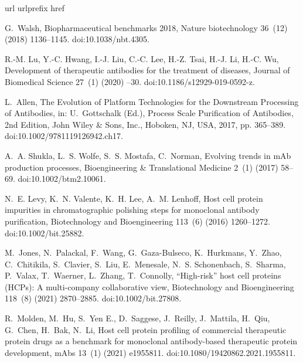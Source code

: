\documentclass[preprint,review,12pt]{elsarticle}
\providecommand{\DIFaddtex}[1]{{\protect\color{blue} \sf #1}} %
\providecommand{\DIFaddbegin}{} %
\providecommand{\DIFaddend}{} %
\providecommand{\DIFadd}[1]{\texorpdfstring{\DIFaddtex{#1}}{#1}} %
\begin{document}

\begin{thebibliography}{10}
\expandafter\ifx\csname url\endcsname\relax
  \def\url#1{\texttt{#1}}\fi
\expandafter\ifx\csname urlprefix\endcsname\relax\def\urlprefix{URL }\fi
\expandafter\ifx\csname href\endcsname\relax
  \def\href#1#2{#2} \def\path#1{#1}\fi

G.~Walsh, {Biopharmaceutical benchmarks 2018}, Nature biotechnology 36~(12)
  (2018) 1136--1145.
\newblock \href {https://doi.org/10.1038/nbt.4305}
  {\path{doi:10.1038/nbt.4305}}.

R.-M. Lu, Y.-C. Hwang, I.-J. Liu, C.-C. Lee, H.-Z. Tsai, H.-J. Li, H.-C. Wu,
  {Development of therapeutic antibodies for the treatment of diseases},
  Journal of Biomedical Science 27~(1) (2020) \DIFaddbegin \DIFadd{1--30}\DIFaddend .
\newblock \href {https://doi.org/10.1186/s12929-019-0592-z}
  {\path{doi:10.1186/s12929-019-0592-z}}.

L.~Allen, {The Evolution of Platform Technologies for the Downstream Processing
  of Antibodies}, in: U.~Gottschalk (Ed.), Process Scale Purification of
  Antibodies, 2nd Edition, John Wiley \& Sons, Inc., Hoboken, NJ, USA, 2017,
  pp. 365--389.
\newblock \href {https://doi.org/10.1002/9781119126942.ch17}
  {\path{doi:10.1002/9781119126942.ch17}}.

A.~A. Shukla, L.~S. Wolfe, S.~S. Mostafa, C.~Norman, {Evolving trends in mAb
  production processes}, Bioengineering \& Translational Medicine 2~(1) (2017)
  58--69.
\newblock \href {https://doi.org/10.1002/btm2.10061}
  {\path{doi:10.1002/btm2.10061}}.

N.~E. Levy, K.~N. Valente, K.~H. Lee, A.~M. Lenhoff, {Host cell protein
  impurities in chromatographic polishing steps for monoclonal antibody
  purification}, Biotechnology and Bioengineering 113~(6) (2016) 1260--1272.
\newblock \href {https://doi.org/10.1002/bit.25882}
  {\path{doi:10.1002/bit.25882}}.

M.~Jones, N.~Palackal, F.~Wang, G.~Gaza-Bulseco, K.~Hurkmans, Y.~Zhao,
  C.~Chitikila, S.~Clavier, S.~Liu, E.~Menesale, N.~S. Schonenbach, S.~Sharma,
  P.~Valax, T.~Waerner, L.~Zhang, T.~Connolly, {“High-risk” host cell
  proteins (HCPs): A multi-company collaborative view}, Biotechnology and
  Bioengineering 118~(8) (2021) 2870--2885.
\newblock \href {https://doi.org/10.1002/bit.27808}
  {\path{doi:10.1002/bit.27808}}.

R.~Molden, M.~Hu, S.~{Yen E.}, D.~Saggese, J.~Reilly, J.~Mattila, H.~Qiu,
  G.~Chen, H.~Bak, N.~Li, {Host cell protein profiling of commercial
  therapeutic protein drugs as a benchmark for monoclonal antibody-based
  therapeutic protein development}, mAbs 13~(1) (2021) e1955811.
\newblock \href {https://doi.org/10.1080/19420862.2021.1955811}
  {\path{doi:10.1080/19420862.2021.1955811}}.


\end{thebibliography}
\end{document}
